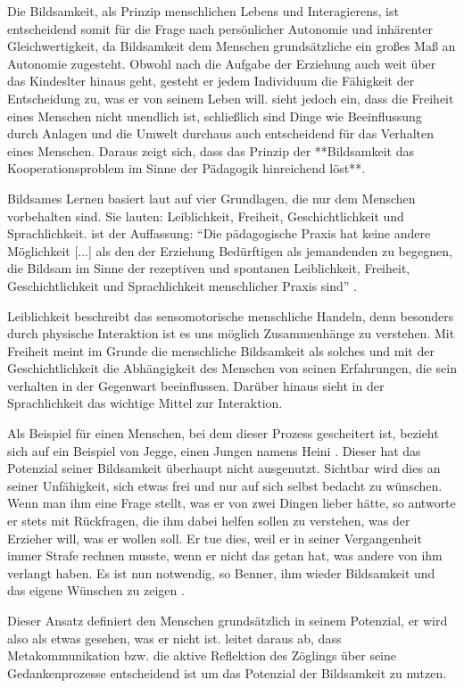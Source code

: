 Die Bildsamkeit, als Prinzip menschlichen Lebens und Interagierens, ist entscheidend somit für die Frage nach persönlicher Autonomie und inhärenter Gleichwertigkeit, da Bildsamkeit dem Menschen grundsätzliche ein großes Maß an Autonomie zugesteht.
Obwohl nach \citeauthor{benner-2012} die Aufgabe der Erziehung auch weit über das Kindeslter hinaus geht, gesteht er jedem Individuum die Fähigkeit der Entscheidung zu, was er von seinem Leben will.
\citeauthor{benner-2012} sieht jedoch ein, dass die Freiheit eines Menschen nicht unendlich ist, schließlich sind Dinge wie Beeinflussung durch Anlagen und die Umwelt durchaus auch entscheidend für das Verhalten eines Menschen.
Daraus zeigt sich, dass das Prinzip der **Bildsamkeit das Kooperationsproblem im Sinne der Pädagogik hinreichend löst**.

Bildsames Lernen basiert laut \citeauthor{benner-2012} auf vier Grundlagen, die nur dem Menschen  vorbehalten sind.
Sie lauten: Leiblichkeit, Freiheit, Geschichtlichkeit und Sprachlichkeit.
\citeauthor{benner-2012} ist der Auffassung:
``Die pädagogische Praxis hat keine andere Möglichkeit [...] als den der Erziehung Bedürftigen als jemandenden zu begegnen, die Bildsam im Sinne der rezeptiven und spontanen Leiblichkeit, Freiheit, Geschichtlichkeit und Sprachlichkeit menschlicher Praxis sind'' \parencite[vgl.][76]{benner-2012}.

Leiblichkeit beschreibt das sensomotorische menschliche Handeln, denn besonders durch physische Interaktion ist es uns möglich Zusammenhänge zu verstehen.
Mit Freiheit meint \citeauthor{benner-2012} im Grunde die menschliche Bildsamkeit als solches und mit der Geschichtlichkeit die Abhängigkeit des Menschen von seinen Erfahrungen, die sein verhalten in der Gegenwart beeinflussen.
Darüber hinaus sieht \citeauthor{benner-2012} in der Sprachlichkeit das wichtige Mittel zur Interaktion.

Als Beispiel für einen Menschen, bei dem dieser Prozess gescheitert ist, bezieht sich \citeauthor{benner-2012} auf ein Beispiel von Jegge, einen Jungen namens Heini \parencite[vgl.][74]{benner-2012}.
Dieser hat das Potenzial seiner Bildsamkeit überhaupt nicht ausgenutzt.
Sichtbar wird dies an seiner Unfähigkeit, sich etwas frei und nur auf sich selbst bedacht zu wünschen.
Wenn man ihm eine Frage stellt, was er von zwei Dingen lieber hätte, so antworte er stets mit Rückfragen, die ihm dabei helfen sollen zu verstehen, was der Erzieher will, was er wollen soll.
Er tue dies, weil er in seiner Vergangenheit immer Strafe rechnen musste, wenn er nicht das getan hat, was andere von ihm verlangt haben.
Es ist nun notwendig, so Benner, ihm wieder Bildsamkeit und das eigene Wünschen zu zeigen \parencite[vgl.][20]{benner-2012}.

Dieser Ansatz definiert den Menschen grundsätzlich in seinem Potenzial, er wird also als etwas gesehen, was er nicht ist.
\citeauthor{benner-2012}leitet daraus ab, dass Metakommunikation bzw. die aktive Reflektion des Zöglings über seine Gedankenprozesse entscheidend ist um das Potenzial der Bildsamkeit zu nutzen.
